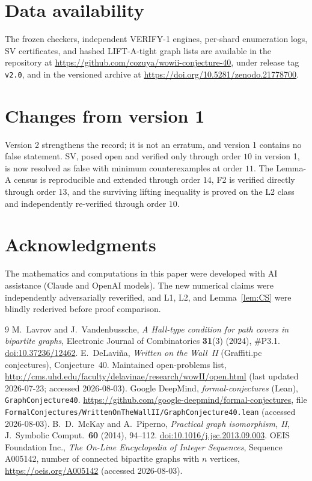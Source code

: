 \documentclass[11pt]{article}
\theoremstyle{plain}
\theoremstyle{definition}
\begin{document}
\section{Data availability}\label{sec:data}

The frozen checkers, independent VERIFY-1 engines, per-shard enumeration logs,
SV certificates, and hashed LIFT-A-tight graph lists are available in the
repository at \url{https://github.com/cozuya/wowii-conjecture-40}, under release
tag \texttt{v2.0}, and in the versioned archive at
\url{https://doi.org/10.5281/zenodo.21778700}.

\section*{Changes from version 1}

Version 2 strengthens the record; it is not an erratum, and version 1 contains
no false statement.  SV, posed open and verified only through order $10$ in
version 1, is now resolved as false with minimum counterexamples at order $11$.
The Lemma-A census is reproducible and extended through order $14$, F2 is
verified directly through order $13$, and the surviving lifting inequality is
proved on the L2 class and independently re-verified through order $10$.

\section*{Acknowledgments}

The mathematics and computations in this paper were developed with AI
assistance (Claude and OpenAI models).  The new numerical claims were
independently adversarially reverified, and L1, L2, and Lemma~\ref{lem:CS} were blindly
rederived before proof comparison.

\begin{thebibliography}{9}
M.~Lavrov and J.~Vandenbussche,
\emph{A Hall-type condition for path covers in bipartite graphs},
Electronic Journal of Combinatorics \textbf{31}(3) (2024), \#P3.1.
\href{https://doi.org/10.37236/12462}{doi:10.37236/12462}.
E.~DeLavi\~na, \emph{Written on the Wall~II} (Graffiti.pc conjectures),
Conjecture~40. Maintained open-problems list,
\url{http://cms.uhd.edu/faculty/delavinae/research/wowII/open.html} (last updated
2026-07-23; accessed 2026-08-03).
Google DeepMind, \emph{formal-conjectures} (Lean), \texttt{GraphConjecture40}.
\url{https://github.com/google-deepmind/formal-conjectures},
file \texttt{FormalConjectures/WrittenOnTheWallII/GraphConjecture40.lean}
(accessed 2026-08-03).
B.~D.~McKay and A.~Piperno, \emph{Practical graph isomorphism, II},
J.~Symbolic Comput.\ \textbf{60} (2014), 94--112.
\href{https://doi.org/10.1016/j.jsc.2013.09.003}{doi:10.1016/j.jsc.2013.09.003}.
OEIS Foundation Inc., \emph{The On-Line Encyclopedia of Integer Sequences},
Sequence A005142, number of connected bipartite graphs with $n$ vertices,
\url{https://oeis.org/A005142} (accessed 2026-08-03).
\end{thebibliography}
\end{document}
